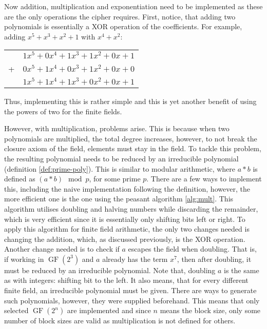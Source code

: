 \documentclass{Resources/UoBLab1}
\theoremstyle{definition}
\begin{document}
Now addition, multiplication and exponentiation need to be implemented as these are the only operations the cipher requires. First, notice, that adding two polynomials is essentially a XOR operation of the coefficients. For example, adding $x^5 + x^3 + x^2 + 1$ with $x^4 + x^2$:
\begin{table}[h]
    \centering
    \begin{tabular}{l r}
        & $1x^5 + 0x^4 + 1x^3 + 1x^2 + 0x + 1$ \\
        +& $0x^5 + 1x^4 + 0x^3 + 1x^2 + 0x + 0$ \\
        \hline
        & $1x^5 + 1x^4 + 1x^3 + 0x^2 + 0x + 1$
    \end{tabular}
\end{table}

Thus, implementing this is rather simple and this is yet another benefit of using the powers of two for the finite fields.

However, with multiplication, problems arise. This is because when two polynomials are multiplied, the total degree increases, however, to not break the closure axiom of the field, elements must stay in the field. To tackle this problem, the resulting polynomial needs to be reduced by an irreducible polynomial (definition \ref{def:prime-poly}). This is similar to modular arithmetic, where $a * b$ is defined as $(a * b) \mod p$, for some prime $p$. There are a few ways to implement this, including the naive implementation following the definition, however, the more efficient one is the one using the peasant algorithm \ref{alg:mult}. This algorithm utilises doubling and halving numbers while discarding the remainder, which is very efficient since it is essentially only shifting bits left or right. To apply this algorithm for finite field arithmetic, the only two changes needed is changing the addition, which, as discussed previously, is the XOR operation. Another change needed is to check if $a$ escapes the field when doubling. That is, if working in $\operatorname{GF}(2^3)$ and $a$ already has the term $x^7$, then after doubling, it must be reduced by an irreducible polynomial. Note that, doubling $a$ is the same as with integers: shifting bit to the left. It also means, that for every different finite field, an irreducible polynomial must be given. There are ways to generate such polynomials, however, they were supplied beforehand. This means that only selected $\operatorname{GF}(2^n)$ are implemented and since $n$ means the block size, only some number of block sizes are valid as multiplication is not defined for others.
\end{document}
